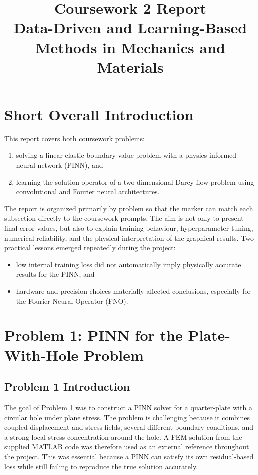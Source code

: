 \documentclass[11pt]{article}
\title{Coursework 2 Report\\Data-Driven and Learning-Based Methods in Mechanics and Materials}
\author{}
\date{}
\begin{document}
\maketitle

\section*{Short Overall Introduction}

This report covers both coursework problems:
\begin{enumerate}[itemsep=0.25em]
    \item solving a linear elastic boundary value problem with a physics-informed neural network (PINN), and
    \item learning the solution operator of a two-dimensional Darcy flow problem using convolutional and Fourier neural architectures.
\end{enumerate}

The report is organized primarily by problem so that the marker can match each subsection directly to the coursework prompts. The aim is not only to present final error values, but also to explain training behaviour, hyperparameter tuning, numerical reliability, and the physical interpretation of the graphical results. Two practical lessons emerged repeatedly during the project:
\begin{itemize}[itemsep=0.25em]
    \item low internal training loss did not automatically imply physically accurate results for the PINN, and
    \item hardware and precision choices materially affected conclusions, especially for the Fourier Neural Operator (FNO).
\end{itemize}

\section{Problem 1: PINN for the Plate-With-Hole Problem}

\subsection*{Problem 1 Introduction}

The goal of Problem 1 was to construct a PINN solver for a quarter-plate with a circular hole under plane stress. The problem is challenging because it combines coupled displacement and stress fields, several different boundary conditions, and a strong local stress concentration around the hole. A FEM solution from the supplied MATLAB code was therefore used as an external reference throughout the project. This was essential because a PINN can satisfy its own residual-based loss while still failing to reproduce the true solution accurately.
\end{document}
